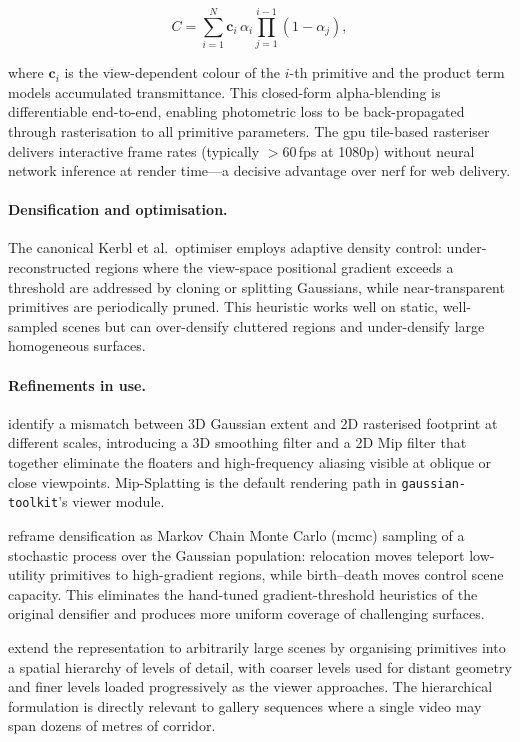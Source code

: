 \begin{equation}
  C = \sum_{i=1}^{N} \mathbf{c}_i\,\alpha_i
  \prod_{j=1}^{i-1}\!\left(1 - \alpha_j\right),
  \label{eq:blending}
\end{equation}

where $\mathbf{c}_i$ is the view-dependent colour of the $i$-th primitive and the
product term models accumulated transmittance. This closed-form alpha-blending is
differentiable end-to-end, enabling photometric loss to be back-propagated through
rasterisation to all primitive parameters. The \acrshort{gpu} tile-based rasteriser
delivers interactive frame rates (typically $>$60\,fps at 1080p) without neural
network inference at render time---a decisive advantage over \acrshort{nerf} for
web delivery.

\paragraph{Densification and optimisation.}
The canonical Kerbl et al.\ optimiser employs adaptive density control: under-
reconstructed regions where the view-space positional gradient exceeds a threshold
are addressed by cloning or splitting Gaussians, while near-transparent primitives
are periodically pruned. This heuristic works well on static, well-sampled scenes
but can over-densify cluttered regions and under-densify large homogeneous surfaces.

\paragraph{Refinements in use.}
\textcite{Yu2024MipSplatting} identify a mismatch between 3D Gaussian extent and
2D rasterised footprint at different scales, introducing a 3D smoothing filter
and a 2D Mip filter that together eliminate the floaters and high-frequency
aliasing visible at oblique or close viewpoints. Mip-Splatting is the default
rendering path in \texttt{gaussian-toolkit}'s viewer module.

\textcite{Kheradmand2024} reframe densification as Markov Chain Monte Carlo
(\acrshort{mcmc}) sampling of a stochastic process over the Gaussian population:
relocation moves teleport low-utility primitives to high-gradient regions, while
birth--death moves control scene capacity. This eliminates the hand-tuned
gradient-threshold heuristics of the original densifier and produces more
uniform coverage of challenging surfaces.

\textcite{Kerbl2024Hierarchical} extend the representation to arbitrarily large
scenes by organising primitives into a spatial hierarchy of levels of detail, with
coarser levels used for distant geometry and finer levels loaded progressively as
the viewer approaches. The hierarchical formulation is directly relevant to gallery
sequences where a single video may span dozens of metres of corridor.

